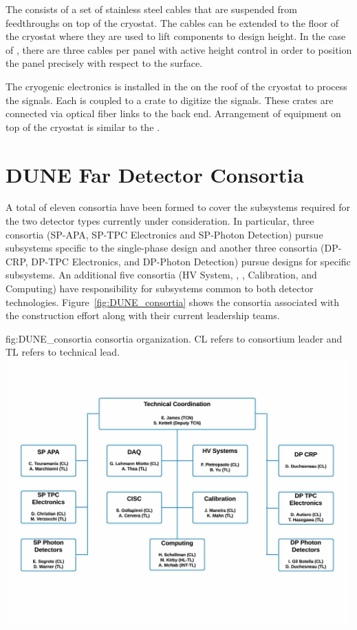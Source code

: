 The   consists of a set of stainless steel
cables that are suspended from feedthroughs on top of the
cryostat. The cables can be extended to the floor of the cryostat where
they are used to lift components to design height. In the case of
, there are three cables per panel with active height
control in order to position the panel precisely with respect to the
 surface.

The cryogenic  electronics is installed in the
 on the roof of the cryostat to process the
 signals. Each  is coupled to a 
crate to digitize the signals. These crates are connected via optical
fiber links to the  back end. Arrangement of equipment on
top of the cryostat is similar to the .

\section{DUNE Far Detector Consortia}
\label{sec:fdconsortia}

A total of eleven  consortia have been formed to cover 
the subsystems required for the two detector types currently under
consideration.  In particular, three consortia (SP-APA, SP-TPC
Electronics and SP-Photon Detection) pursue subsystems specific to
the single-phase design and another three consortia (DP-CRP, DP-TPC
Electronics, and DP-Photon Detection) pursue designs for 
specific subsystems.  An additional five consortia (HV System, ,
, Calibration, and Computing)
have responsibility for subsystems common to both detector
technologies.  Figure~\ref{fig:DUNE_consortia} shows the consortia 
associated with the  construction effort along with their 
current leadership teams.  
\begin{dunefigure}{fig:DUNE_consortia}
  { consortia organization. CL refers to consortium leader
    and TL refers to technical lead.}
  \includegraphics[width=0.99\textwidth]{graphics/Consortia_Org_Chart}
\end{dunefigure}

